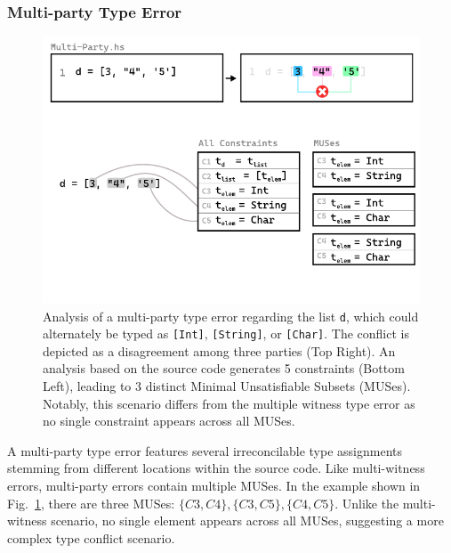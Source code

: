 \documentclass[pdflatex,sn-mathphys-num]{sn-jnl}%
\begin{document}
\subsubsection*{Multi-party Type Error}

\begin{figure}[hbt]
  \centering
  \includegraphics[width=\linewidth]{images/Multi-Party-MUS}
  \caption[Illustration of a multi-party type error in the context of MUSes]{\label{fig:multi-party-2} Analysis of a multi-party type error regarding the list \texttt{d}, which could alternately be typed as \texttt{[Int]}, \texttt{[String]}, or \texttt{[Char]}. The conflict is depicted as a disagreement among three parties (Top Right). An analysis based on the source code generates 5 constraints (Bottom Left), leading to 3 distinct Minimal Unsatisfiable Subsets (MUSes). Notably, this scenario differs from the multiple witness type error as no single constraint appears across all MUSes.}
  \end{figure}

  A multi-party type error features several irreconcilable type assignments stemming from different locations within the source code. Like multi-witness errors, multi-party errors contain multiple MUSes. In the example shown in Fig.~\ref{fig:multi-party-2}, there are three MUSes: $\{C3, C4\}, \{C3, C5\}, \{C4, C5\}$. Unlike the multi-witness scenario, no single element appears across all MUSes, suggesting a more complex type conflict scenario. 

  

\end{document}
